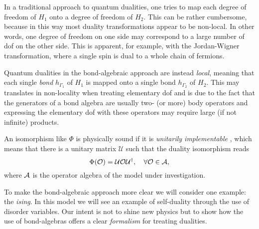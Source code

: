 In a traditional approach to quantum dualities, one tries to map each degree of freedom of $H_1$ onto a degree of freedom of $H_2$.
This can be rather cumbersome, because in this way most duality transformations appear to be non-local.
In other words, one degree of freedom on one side may correspond to a large number of \ac{dof} on the other side.
This is apparent, for example, with the Jordan-Wigner transformation, where a single spin is dual to a whole chain of fermions.

Quantum dualities in the bond-algebraic approach are instead \emph{local}, meaning that each single \emph{bond} $h_{\Gamma_1}$ of $H_1$ is mapped onto a single bond $h_{\Gamma_2}$ of $H_2$.
This may translates in non-locality when treating elementary \ac{dof} and is due to the fact that the generators of a bond algebra are usually two- (or more) body operators and expressing the elementary \ac{dof} with these operators may require large (if not infinite) products.

An isomorphism like $\Phi$ is physically sound if it is \emph{unitarily implementable} \cite{cobanera2011bond}, which means that there is a unitary matrix $\mathcal{U}$ such that the duality isomorphism reads
\begin{equation}
    \Phi(\mathcal{O}) =
    \mathcal{U} \mathcal{O} \mathcal{U}^{\dagger}, \quad
    \forall \mathcal{O} \in \mathcal{A},
\end{equation}
where $\mathcal{A}$ is the operator algebra of the model under investigation.


To make the bond-algebraic approach more clear we will consider one example: the \emph{\acf{ising}}.
In this model we will see an example of self-duality through the use of disorder variables.
Our intent is not to shine new physics but to show how the use of bond-algebras offers a clear \emph{formalism} for treating dualities.





